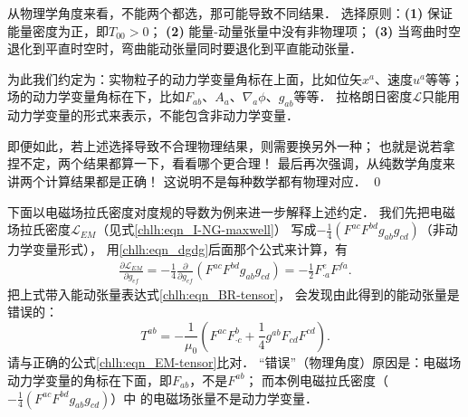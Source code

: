 \begin{remark}\label{chlh:rek_dynamical-variables}
    从物理学角度来看，不能两个都选，那可能导致不同结果．
    选择原则：{\bfseries (1)} 保证能量密度为正，即$T_{00}>0$；
    {\bfseries (2)} 能量-动量张量中没有非物理项；
    {\bfseries (3)} 当弯曲时空退化到平直时空时，弯曲能动张量同时要退化到平直能动张量．
    
    为此我们约定为：实物粒子的动力学变量角标在上面，比如位矢$x^a$、速度$u^a$等等；
    场的动力学变量角标在下，比如$F_{ab}$、$A_a$、$\nabla_a\phi$、$g_{ab}$等等．
    拉格朗日密度$\mathscr{L}$只能用动力学变量的形式来表示，不能包含非动力学变量．
    
    即便如此，若上述选择导致不合理物理结果，则需要换另外一种；
    也就是说若拿捏不定，两个结果都算一下，看看哪个更合理！
    最后再次强调，从纯数学角度来讲两个计算结果都是正确！ 
    这说明不是每种数学都有物理对应． \qed
\end{remark}


下面以电磁场拉氏密度对度规的导数为例来进一步解释上述约定．
我们先把电磁场拉氏密度$\mathscr{L}_{EM}$（见式\eqref{chlh:eqn_I-NG-maxwell}）
写成$-\frac{1}{4}\left(F^{ac} F^{bd} g_{ab} g_{cd} \right)$（非动力学变量形式），
用\eqref{chlh:eqn_dgdg}后面那个公式来计算，有
\begin{align*}
    \frac{\partial \mathscr{L}_{EM}}{\partial g_{ef}} = -\frac{1}{4}
    \frac{\partial }{\partial g_{ef}}\left(F^{ac} F^{bd} g_{ab} g_{cd} \right) %
    = -\frac{1}{2}  F^{e}_{\cdot a} F^{fa} .
\end{align*}
把上式带入能动张量表达式\eqref{chlh:eqn_BR-tensor}，
会发现由此得到的能动张量是错误的：
\begin{equation*}
    T^{ab}=-\frac{1}{\mu_0} \left( F^{ac} F^{b}_{\cdot c} + \frac{1}{4} g^{ab} F_{cd} F^{cd} \right) .
\end{equation*}
请与正确的公式\eqref{chlh:eqn_EM-tensor}比对．
“错误”（物理角度）原因是：电磁场动力学变量的角标在下面，即$F_{ab}$，不是$F^{ab}$；
而本例电磁拉氏密度（$-\frac{1}{4}\left(F^{ac} F^{bd} g_{ab} g_{cd} \right)$）中
的电磁场张量不是动力学变量．



